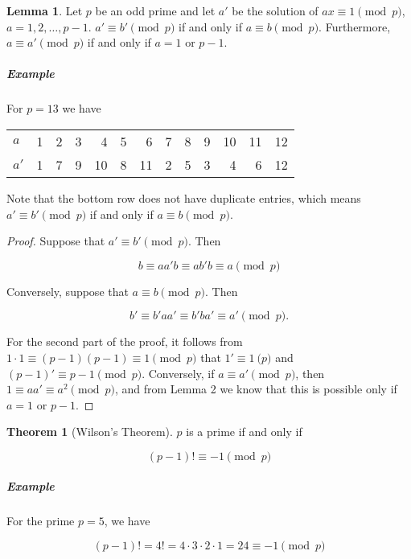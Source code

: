 \documentclass{article}
\theoremstyle{definition} %
\newtheorem{theorem}{Theorem}[section] %
\theoremstyle{definition}
\theoremstyle{definition}
\newtheorem{lemma}{Lemma}[section]
\theoremstyle{definition}
\begin{document}
  \begin{lemma}
    Let $p$ be an odd prime and let $a'$ be the solution of $ax \equiv 1 \pmod{p}$,
    $a = 1, 2, \dots, p -1$. $a' \equiv b' \pmod{p}$ if and only if $a \equiv b \pmod{p}$.
    Furthermore, $a \equiv a' \pmod{p}$ if and only if $a = 1$ or $p - 1$.
  \end{lemma}
  
  \subparagraph{Example} For $p = 13$ we have
  
  \begin{center}
    \begin{tabular}{ l | r r r r r r r r r r r r }
      $a$  & 1 & 2 & 3 &  4 &  5 & 6  & 7  & 8 & 9 & 10 & 11 & 12  \\
      $a'$ & 1 & 7 & 9 & 10 & 8 & 11 & 2 & 5 & 3 & 4 & 6 & 12
    \end{tabular}
  \end{center}
  
  Note that the bottom row does not have duplicate entries, which means
  $a' \equiv b' \pmod{p}$ if and only if $a \equiv b \pmod{p}$.
  
  \begin{proof}
    Suppose that $a' \equiv b' \pmod{p}$. Then
    
    \[ b \equiv aa'b \equiv ab'b \equiv a \pmod{p} \]
    
    Conversely, suppose that $a \equiv b \pmod{p}$. Then
    
    \[ b' \equiv b'aa' \equiv b'ba' \equiv a' \pmod{p}. \]
    
    For the second part of the proof, it follows from $1 \cdot 1 \equiv (p - 1)(p - 1)
    \equiv 1 \pmod{p}$ that $1' \equiv 1 \pod{p}$ and $(p - 1)' \equiv p - 1 \pmod{p}$.
    Conversely, if $a \equiv a' \pmod{p}$, then $1 \equiv aa' \equiv a^2 \pmod{p}$, and
    from Lemma 2 we know that this is possible only if $a = 1$ or $p - 1$.
  \end{proof}
  
  \begin{theorem}[Wilson's Theorem]
    $p$ is a prime if and only if
    
    \[ (p - 1)! \equiv -1 \pmod{p} \]
  \end{theorem}
  
  \subparagraph{Example} For the prime $p = 5$, we have
  
  \[ (p - 1)! = 4! = 4 \cdot 3 \cdot 2 \cdot 1 = 24 \equiv -1 \pmod{p} \]
  
\end{document}
